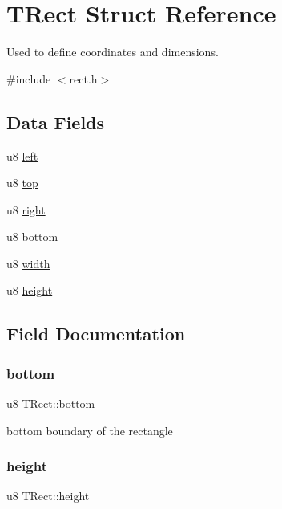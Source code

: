 \hypertarget{structTRect}{}\section{T\+Rect Struct Reference}
\label{structTRect}


Used to define coordinates and dimensions.  




{\ttfamily \#include $<$rect.\+h$>$}

\subsection*{Data Fields}
\begin{DoxyCompactItemize}
\item 
u8 \mbox{\hyperlink{structTRect_abf4bc428ae2b560efda3c60687a73f00}{left}}
\item 
u8 \mbox{\hyperlink{structTRect_a145b5ca0d242dc39c33f1fa72dd04056}{top}}
\item 
u8 \mbox{\hyperlink{structTRect_ae2a5778c81eb1e464703e1a563e7dcf0}{right}}
\item 
u8 \mbox{\hyperlink{structTRect_a225c7bff13bd2bb02d55a517f4c34eb2}{bottom}}
\item 
u8 \mbox{\hyperlink{structTRect_a1a0b1f4f8d316782395a16e4b88bc66f}{width}}
\item 
u8 \mbox{\hyperlink{structTRect_a8808bb53b01ed90c0d41b3360a9f6b95}{height}}
\end{DoxyCompactItemize}


\subsection{Field Documentation}
\mbox{\label{structTRect_a225c7bff13bd2bb02d55a517f4c34eb2}} 
\subsubsection{\texorpdfstring{bottom}{bottom}}
{\footnotesize\ttfamily u8 T\+Rect\+::bottom}

bottom boundary of the rectangle \mbox{\label{structTRect_a8808bb53b01ed90c0d41b3360a9f6b95}} 
\subsubsection{\texorpdfstring{height}{height}}
{\footnotesize\ttfamily u8 T\+Rect\+::height}

